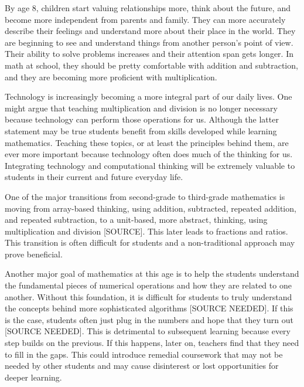 \documentclass[12pt]{extarticle}
\begin{document}
By age 8, children start valuing relationships more, think about the future, and become more independent from parents and family. They can more accurately describe their feelings and understand more about their place in the world. They are beginning to see and understand things from another person’s point of view. Their ability to solve problems increases and their attention span gets longer. In math at school, they should be pretty comfortable with addition and subtraction, and they are becoming more proficient with multiplication.

Technology is increasingly becoming a more integral part of our daily lives. One might argue that teaching multiplication and division is no longer necessary because technology can perform those operations for us. Although the latter statement may be true students benefit from skills developed while learning mathematics. Teaching these topics, or at least the principles behind them, are ever more important because technology often does much of the thinking for us. Integrating technology and computational thinking will be extremely valuable to students in their current and future everyday life. 

One of the major transitions from second-grade to third-grade mathematics is moving from array-based thinking, using addition, subtracted, repeated addition, and repeated subtraction, to a unit-based, more abstract, thinking, using multiplication and division [SOURCE]. This later leads to fractions and ratios. This transition is often difficult for students and a non-traditional approach may prove beneficial.

Another major goal of mathematics at this age is to help the students understand the fundamental pieces of numerical operations and how they are related to one another. Without this foundation, it is difficult for students to truly understand the concepts behind more sophisticated algorithms [SOURCE NEEDED]. If this is the case, students often just plug in the numbers and hope that they turn out [SOURCE NEEDED]. This is detrimental to subsequent learning because every step builds on the previous. If this happens, later on, teachers find that they need to fill in the gaps. This could introduce remedial coursework that may not be needed by other students and may cause disinterest or lost opportunities for deeper learning.
\end{document}
